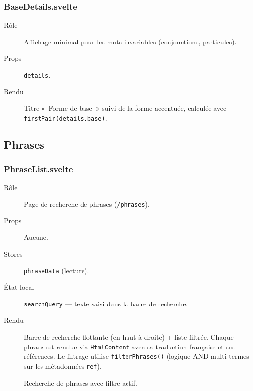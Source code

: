 \subsubsection{BaseDetails.svelte}

\begin{description}
  \item[Rôle] Affichage minimal pour les mots invariables (conjonctions, particules).
  \item[Props] \texttt{details}.
  \item[Rendu] Titre «~Forme de base~» suivi de la forme accentuée, calculée avec \texttt{firstPair(details.base)}.
\end{description}

\subsection{Phrases}

\subsubsection{PhraseList.svelte}

\begin{description}
  \item[Rôle] Page de recherche de phrases (\texttt{/phrases}).
  \item[Props] Aucune.
  \item[Stores] \texttt{phraseData} (lecture).
  \item[État local] \texttt{searchQuery} --- texte saisi dans la barre de recherche.
  \item[Rendu] Barre de recherche flottante (en haut à droite) + liste filtrée. Chaque phrase est rendue via \texttt{HtmlContent} avec sa traduction française et ses références. Le filtrage utilise \texttt{filterPhrases()} (logique AND multi-termes sur les métadonnées \texttt{ref}).
\end{description}

\begin{figure}[ht]
  \centering
  \caption{Recherche de phrases avec filtre actif.}
  \label{fig:phrase-search}
\end{figure}

